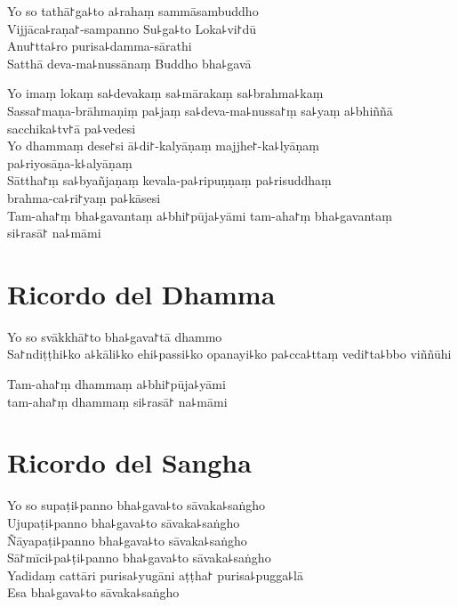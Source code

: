 Yo so tathā꜓ga꜕to a꜕rahaṃ sammāsambuddho\\
Vijjāca꜕raṇa꜓-sampanno Su꜕ga꜕to Loka꜕vi꜓dū\\
Anu꜓tta꜕ro purisa꜕damma-sārathi\\
Satthā deva-ma꜕nussānaṃ Buddho bha꜕gavā

Yo imaṃ lokaṃ sa꜕devakaṃ sa꜕mārakaṃ sa꜕brahma꜕kaṃ\\
Sassa꜓maṇa-brāhmaṇiṃ pa꜕jaṃ sa꜕deva-ma꜕nussa꜓ṃ sa꜕yaṃ a꜕bhiññā sacchika꜕tv꜓ā pa꜕vedesi\\
Yo dhammaṃ dese꜓si ā꜕di꜓-kalyāṇaṃ majjhe꜓-ka꜕lyāṇaṃ\\
pa꜕riyosāṇa-k꜕alyāṇaṃ\\
Sāttha꜓ṃ sa꜕byañjaṇaṃ kevala-pa꜕ripuṇṇaṃ pa꜕risuddhaṃ\\
brahma-ca꜕ri꜓yaṃ pa꜕kāsesi\\

Tam-aha꜓ṃ bha꜕gavantaṃ a꜕bhi꜓pūja꜕yāmi tam-aha꜓ṃ bha꜕gavantaṃ\\
si꜕rasā꜓ na꜕māmi 

\chapter{Ricordo del Dhamma}     %

\begin{leader}
\end{leader}

Yo so svākkhā꜓to bha꜕gava꜓tā dhammo\\
Sa꜓ndiṭṭhi꜕ko a꜕kāli꜕ko ehi꜕passi꜕ko opanayi꜕ko pa꜕cca꜕ttaṃ vedi꜓ta꜕bbo viññūhi

Tam-aha꜓ṃ dhammaṃ a꜕bhi꜓pūja꜕yāmi\\
\vin tam-aha꜓ṃ dhammaṃ si꜕rasā꜓ na꜕māmi 

\enlargethispage{\baselineskip}
\clearpage

\chapter{Ricordo del Sangha}     %

\begin{leader}
\end{leader}

Yo so supaṭi꜕panno bha꜕gava꜕to sāvaka꜕saṅgho\\
Ujupaṭi꜕panno bha꜕gava꜕to sāvaka꜕saṅgho\\
Ñāyapaṭi꜕panno bha꜕gava꜕to sāvaka꜕saṅgho\\
Sā꜓mīci꜕pa꜕ṭi꜕panno bha꜕gava꜕to sāvaka꜕saṅgho\\
Yadidaṃ cattāri purisa꜕yugāni aṭṭha꜓ purisa꜕pugga꜕lā\\
Esa bha꜕gava꜕to sāvaka꜕saṅgho

